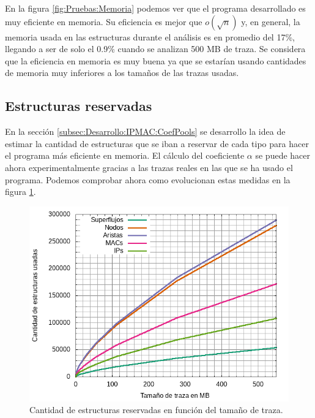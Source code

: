 \documentclass[twoside, 12pt]{epstfg}
\begin{document}
En la figura \ref{fig:Pruebas:Memoria} podemos ver que el programa desarrollado es muy eficiente en memoria. Su eficiencia es mejor que $o(\sqrt{n})$ y, en general, la memoria usada en las estructuras durante el análisis es en promedio del 17\%, llegando a ser de solo el 0.9\% cuando se analizan 500 MB de traza. Se considera que la eficiencia en memoria es muy buena ya que se estarían usando cantidades de memoria muy inferiores a los tamaños de las trazas usadas. %

\subsection{Estructuras reservadas}
En la sección \ref{subsec:Desarrollo:IPMAC:CoefPools} se desarrollo la idea de estimar la cantidad de estructuras que se iban a reservar de cada tipo para hacer el programa más eficiente en memoria. El cálculo del coeficiente $\alpha$ se puede hacer ahora experimentalmente gracias a las trazas reales en las que se ha usado el programa. Podemos comprobar ahora como evolucionan estas medidas en la figura \ref{fig:Pruebas:Estructuras}.

\begin{figure}[H]
\centering
\includegraphics[scale=0.8]{latex/gnuplot/png/structures.png}
\caption[Gráfica de estructuras utilizadas]{Cantidad de estructuras reservadas en función del tamaño de traza.}
\label{fig:Pruebas:Estructuras}
\end{figure}
\end{document}
